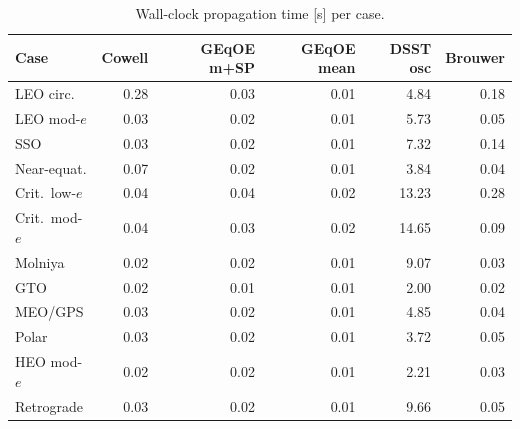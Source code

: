\begin{table}[ht]
\centering
\caption{Wall-clock propagation time [s] per case.}
\label{tab:dsst_timing}
\small
\begin{tabular}{@{}lrrrrr@{}}
\toprule
Case & Cowell & GEqOE m+SP & GEqOE mean & DSST osc & Brouwer \\
\midrule
LEO circ. & 0.28 & 0.03 & 0.01 & 4.84 & 0.18 \\
LEO mod-$e$ & 0.03 & 0.02 & 0.01 & 5.73 & 0.05 \\
SSO & 0.03 & 0.02 & 0.01 & 7.32 & 0.14 \\
Near-equat. & 0.07 & 0.02 & 0.01 & 3.84 & 0.04 \\
Crit.\ low-$e$ & 0.04 & 0.04 & 0.02 & 13.23 & 0.28 \\
Crit.\ mod-$e$ & 0.04 & 0.03 & 0.02 & 14.65 & 0.09 \\
Molniya & 0.02 & 0.02 & 0.01 & 9.07 & 0.03 \\
GTO & 0.02 & 0.01 & 0.01 & 2.00 & 0.02 \\
MEO/GPS & 0.03 & 0.02 & 0.01 & 4.85 & 0.04 \\
Polar & 0.03 & 0.02 & 0.01 & 3.72 & 0.05 \\
HEO mod-$e$ & 0.02 & 0.02 & 0.01 & 2.21 & 0.03 \\
Retrograde & 0.03 & 0.02 & 0.01 & 9.66 & 0.05 \\
\bottomrule
\end{tabular}
\end{table}